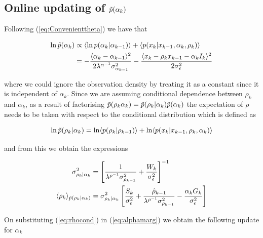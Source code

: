 \documentclass{article}
\begin{document}
\subsection{Online updating of $\tilde{p}(\alpha_k)$}

Following (\ref{eq:Convenienttheta}) we have that

\begin{equation} \label{eq:alphamarg}
\begin{split}
\ln \pt(\alpha_{k}) &\propto \langle \ln p(\alpha_k | \alpha_{k-1})\rangle + \langle p(x_k | x_{k-1}, \alpha_k, \rho_k) \rangle \\
&= - \frac{\langle \alpha_{k} - \alpha_{k-1} \rangle^2}{2\lambda^{\alpha^{-1}}\sigma^2_{\alpha_{k-1}}}  - \frac{\langle x_k - \rho_k x_{k-1} - \alpha_{k}I_k\rangle^2}{2\sigma^2_\epsilon}
\end{split}
\end{equation}

\noindent where we could ignore the observation density by treating it as a constant since it is independent of $\alpha_k$. Since we are assuming conditional dependence between $\rho_k$ and $\alpha_k$, as a result of factorising $\tilde{p}(\rho_k\alpha_k) = \tilde{p}(\rho_k | \alpha_k)\tilde{p}(\alpha_k)$ the expectation of $\rho$ needs to be taken with respect to the conditional distribution which is defined as

\begin{equation}
\ln \tilde{p}(\rho_k | \alpha_k) = \ln \langle p(\rho_k | \rho_{k-1}) \rangle + \ln \langle p(x_k | x_{k-1}, \rho_k, \alpha_k) \rangle
\end{equation}

\noindent and from this we obtain the expressions

\begin{equation}\label{eq:rhocond}
\begin{split}
\sigma^2_{\rho_k | \alpha_k} &= \left[\frac{1}{\lambda^{\rho^{-1}}\sigma^2_{\rho_{k-1}}} + \frac{W_k}{\sigma^2_\epsilon} \right]^{-1} \\
\langle \rho_k \rangle_{\pt(\rho_k | \alpha_k)} &= \sigma^2_{\rho_k | \alpha_k}\left[\frac{S_k}{\sigma^2_\epsilon} + \frac{\hat{\rho}_{k-1}}{\lambda^{\rho^{-1}}\sigma^2_{\rho_{k-1}}} - \frac{\alpha_kG_k}{\sigma^2_\epsilon} \right]
\end{split}
\end{equation}

On substituting (\ref{eq:rhocond}) in (\ref{eq:alphamarg}) we obtain the following update for $\alpha_k$
\end{document}
